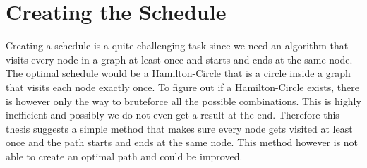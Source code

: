\section{Creating the Schedule}
\label{chp:apr_creatingSchedule}
Creating a schedule is a quite challenging task since we need an algorithm that visits every node in a graph at least once and starts and ends at the same node. The optimal schedule would be a Hamilton-Circle that is a circle inside a graph that visits each node exactly once. To figure out if a Hamilton-Circle exists, there is however only the way to bruteforce all the possible combinations. This is highly inefficient and possibly we do not even get a result at the end. Therefore this thesis suggests a simple method that makes sure every node gets visited at least once and the path starts and ends at the same node. This method however is not able to create an optimal path and could be improved.

